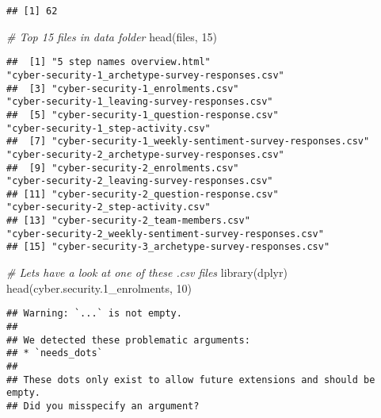 \documentclass[
]{article}
\newenvironment{Shaded}{\begin{snugshade}}{\end{snugshade}}
\newcommand{\CommentTok}[1]{\textcolor[rgb]{0.56,0.35,0.01}{\textit{#1}}}
\newcommand{\DecValTok}[1]{\textcolor[rgb]{0.00,0.00,0.81}{#1}}
\newcommand{\FloatTok}[1]{\textcolor[rgb]{0.00,0.00,0.81}{#1}}
\newcommand{\FunctionTok}[1]{\textcolor[rgb]{0.00,0.00,0.00}{#1}}
\newcommand{\NormalTok}[1]{#1}
\begin{document}
\begin{verbatim}
## [1] 62
\end{verbatim}

\begin{Shaded}
\begin{Highlighting}[]
\CommentTok{\# Top 15 files in data folder}
\FunctionTok{head}\NormalTok{(files, }\DecValTok{15}\NormalTok{)}
\end{Highlighting}
\end{Shaded}

\begin{verbatim}
##  [1] "5 step names overview.html"                             "cyber-security-1_archetype-survey-responses.csv"       
##  [3] "cyber-security-1_enrolments.csv"                        "cyber-security-1_leaving-survey-responses.csv"         
##  [5] "cyber-security-1_question-response.csv"                 "cyber-security-1_step-activity.csv"                    
##  [7] "cyber-security-1_weekly-sentiment-survey-responses.csv" "cyber-security-2_archetype-survey-responses.csv"       
##  [9] "cyber-security-2_enrolments.csv"                        "cyber-security-2_leaving-survey-responses.csv"         
## [11] "cyber-security-2_question-response.csv"                 "cyber-security-2_step-activity.csv"                    
## [13] "cyber-security-2_team-members.csv"                      "cyber-security-2_weekly-sentiment-survey-responses.csv"
## [15] "cyber-security-3_archetype-survey-responses.csv"
\end{verbatim}

\begin{Shaded}
\begin{Highlighting}[]
\CommentTok{\# Let\textquotesingle{}s have a look at one of these .csv files}
\FunctionTok{library}\NormalTok{(dplyr)}
\FunctionTok{head}\NormalTok{(cyber.security}\FloatTok{.1}\NormalTok{\_enrolments, }\DecValTok{10}\NormalTok{)}
\end{Highlighting}
\end{Shaded}

\begin{verbatim}
## Warning: `...` is not empty.
## 
## We detected these problematic arguments:
## * `needs_dots`
## 
## These dots only exist to allow future extensions and should be empty.
## Did you misspecify an argument?
\end{verbatim}
\end{document}
